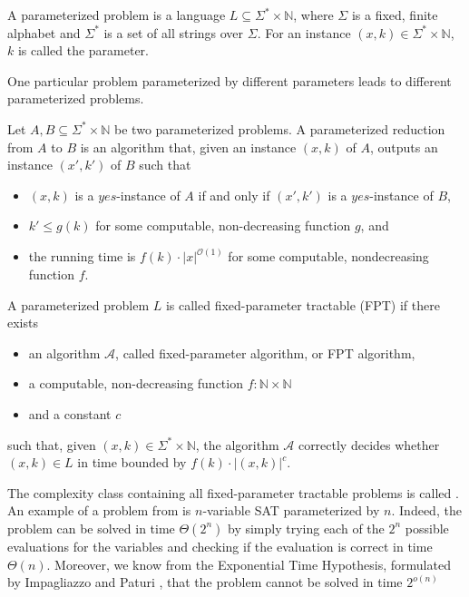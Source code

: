 \begin{definition}
    A parameterized problem is a language $L \subseteq \Sigma^* \times \mathbb{N}$, where
    $\Sigma$ is a fixed, finite alphabet and $\Sigma^*$ is a set of all strings over $\Sigma$.
    For an instance $(x, k) \in \Sigma^* \times \mathbb{N}$, $k$ is called the parameter.
\end{definition}

One particular problem parameterized by different parameters leads to different parameterized problems.

\begin{definition}
    Let $A,B \subseteq \Sigma^* \times \mathbb{N}$ be two parameterized problems.
    A parameterized reduction from $A$ to $B$ is an algorithm that, given an instance $(x, k)$ of $A$,
    outputs an instance $(x', k')$ of $B$ such that
    \begin{itemize}
        \item $(x, k)$ is a $yes$-instance of $A$ if and only if $(x', k')$ is a $yes$-instance of $B$,
        \item $k' \leq g(k)$ for some computable, non-decreasing function $g$, and
        \item the running time is $f(k) \cdot |x|^{\mathcal{O}(1)}$ for some computable, nondecreasing function $f$.
    \end{itemize}
\end{definition}

\begin{definition}[FPT]
    A parameterized problem $L$ is called fixed-parameter tractable (FPT) if there exists
    \begin{itemize}
        \item an algorithm $\mathcal{A}$, called fixed-parameter algorithm, or FPT algorithm,
        \item a computable, non-decreasing function $f : \mathbb{N} \times \mathbb{N}$
        \item and a constant $c$
    \end{itemize}
    such that, given $(x,k) \in \Sigma^* \times \mathbb{N}$,
    the algorithm $\mathcal{A}$ correctly decides whether $(x, k) \in L$ in time bounded by
    $f(k) \cdot |(x,k)|^c$.
\end{definition}

The complexity class containing all fixed-parameter tractable problems is called \FPT.
An example of a problem from \FPT is $n$-variable \textsc{SAT} parameterized by $n$.
Indeed, the problem can be solved in time $\Theta(2^n)$ by simply trying each of the $2^n$
possible evaluations for the variables and checking if the evaluation is correct in time $\Theta(n)$.
Moreover, we know from the Exponential Time Hypothesis, formulated by Impagliazzo and Paturi \cite{Impagliazzo1999},
that the problem cannot be solved in time $2^{o(n)}$


